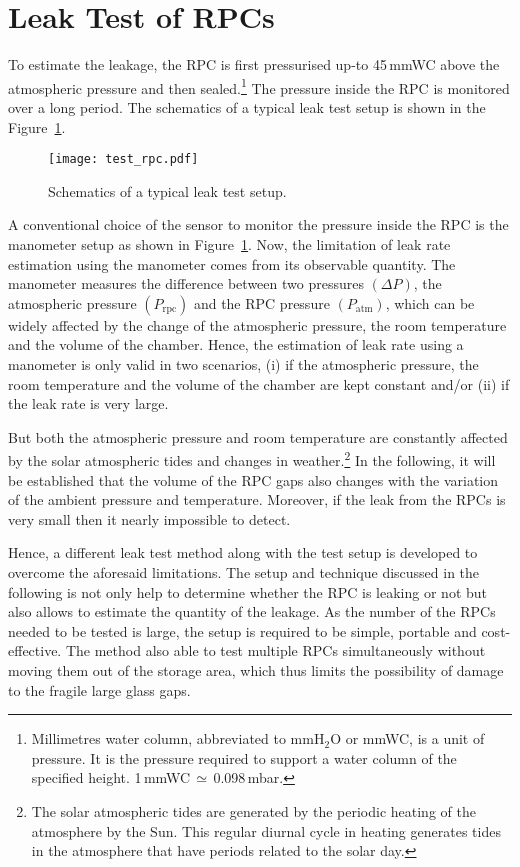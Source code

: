 \section{Leak Test of RPCs}
To estimate the leakage, the RPC is first pressurised up-to 45\,mmWC above the
atmospheric pressure and then sealed.\footnote{Millimetres water column, abbreviated to mmH$_2$O or mmWC, is a unit of pressure. It is the pressure required to support a water column of the specified height. 1\,mmWC\,$\simeq$\,0.098\,mbar.}
The pressure inside the RPC is monitored over a long period. The schematics of
a typical leak test setup is shown in the Figure~\ref{fig:test_rpc}. 
\begin{figure}
  \centering
  \texttt{[image: test\_rpc.pdf]}
  \caption{Schematics of a typical leak test setup.}
  \label{fig:test_rpc}
\end{figure}
A conventional choice of the sensor to monitor the pressure inside the RPC is
the manometer setup as shown in Figure~\ref{fig:test_rpc}. Now, the limitation
of leak rate estimation using the manometer comes from its observable quantity.
The manometer measures the difference between two pressures
$\left(\Delta P\right)$, the atmospheric pressure $\left(P_{\mathrm{rpc}}\right)$
and the RPC pressure $\left(P_{\mathrm{atm}}\right)$, which can be widely affected
by the change of the atmospheric pressure, the room temperature and the volume
of the chamber. Hence, the estimation of leak rate using a manometer is only
valid in two scenarios, (i) if the atmospheric pressure, the room temperature
and the volume of the chamber are kept constant and/or (ii) if the leak rate is
very large.

But both the atmospheric pressure and room temperature are constantly affected
by the solar atmospheric tides and changes in weather.\footnote{The solar atmospheric tides are generated by the periodic heating of the atmosphere by the Sun. This regular diurnal cycle in heating generates tides in the atmosphere that have periods related to the solar day.}
In the following, it will be established that the volume of the RPC gaps also
changes with the variation of the ambient pressure and temperature. Moreover,
if the leak from the RPCs is very small then it nearly impossible to detect.

Hence, a different leak test method along with the test setup is developed to
overcome the aforesaid limitations. The setup and technique discussed in the
following is not only help to determine whether the RPC is leaking or not but
also allows to estimate the quantity of the leakage. As the number of the RPCs
needed to be tested is large, the setup is required to be simple, portable and
cost-effective. The method also able to test multiple RPCs simultaneously
without moving them out of the storage area, which thus limits the possibility
of damage to the fragile large glass gaps.

